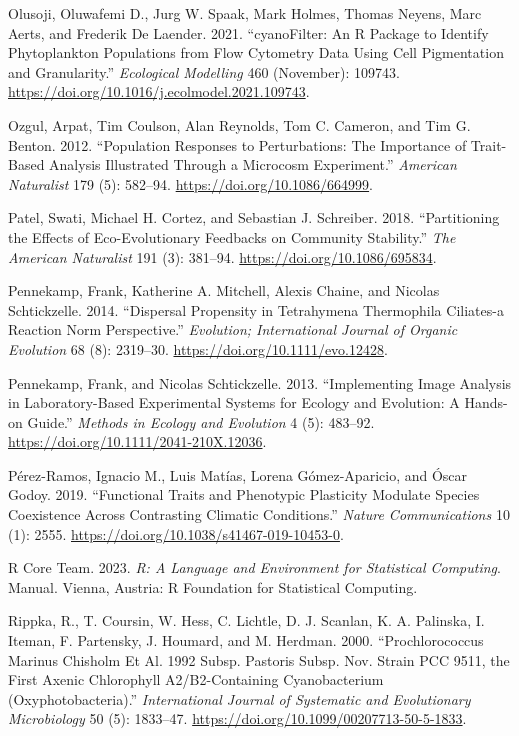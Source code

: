 \documentclass[
  letterpaper,
  DIV=11,
  numbers=noendperiod]{scrartcl}
\begin{document}
\begin{CSLReferences}
Olusoji, Oluwafemi D., Jurg W. Spaak, Mark Holmes, Thomas Neyens, Marc
Aerts, and Frederik De Laender. 2021. {``{cyanoFilter}: {An R} Package
to Identify Phytoplankton Populations from Flow Cytometry Data Using
Cell Pigmentation and Granularity.''} \emph{Ecological Modelling} 460
(November): 109743.
\url{https://doi.org/10.1016/j.ecolmodel.2021.109743}.

Ozgul, Arpat, Tim Coulson, Alan Reynolds, Tom C. Cameron, and Tim G.
Benton. 2012. {``Population Responses to Perturbations: {The} Importance
of Trait-Based Analysis Illustrated Through a Microcosm Experiment.''}
\emph{American Naturalist} 179 (5): 582--94.
\url{https://doi.org/10.1086/664999}.

Patel, Swati, Michael H. Cortez, and Sebastian J. Schreiber. 2018.
{``Partitioning the {Effects} of {Eco-Evolutionary Feedbacks} on
{Community Stability}.''} \emph{The American Naturalist} 191 (3):
381--94. \url{https://doi.org/10.1086/695834}.

Pennekamp, Frank, Katherine A. Mitchell, Alexis Chaine, and Nicolas
Schtickzelle. 2014. {``Dispersal Propensity in Tetrahymena Thermophila
Ciliates-a Reaction Norm Perspective.''} \emph{Evolution; International
Journal of Organic Evolution} 68 (8): 2319--30.
\url{https://doi.org/10.1111/evo.12428}.

Pennekamp, Frank, and Nicolas Schtickzelle. 2013. {``Implementing Image
Analysis in Laboratory-Based Experimental Systems for Ecology and
Evolution: {A} Hands-on Guide.''} \emph{Methods in Ecology and
Evolution} 4 (5): 483--92.
\url{https://doi.org/10.1111/2041-210X.12036}.

Pérez-Ramos, Ignacio M., Luis Matías, Lorena Gómez-Aparicio, and Óscar
Godoy. 2019. {``Functional Traits and Phenotypic Plasticity Modulate
Species Coexistence Across Contrasting Climatic Conditions.''}
\emph{Nature Communications} 10 (1): 2555.
\url{https://doi.org/10.1038/s41467-019-10453-0}.

R Core Team. 2023. \emph{R: {A} Language and Environment for Statistical
Computing}. Manual. {Vienna, Austria}: {R Foundation for Statistical
Computing}.

Rippka, R., T. Coursin, W. Hess, C. Lichtle, D. J. Scanlan, K. A.
Palinska, I. Iteman, F. Partensky, J. Houmard, and M. Herdman. 2000.
{``Prochlorococcus Marinus {Chisholm} Et Al. 1992 Subsp. Pastoris Subsp.
Nov. Strain {PCC} 9511, the First Axenic Chlorophyll A2/B2-Containing
Cyanobacterium ({Oxyphotobacteria}).''} \emph{International Journal of
Systematic and Evolutionary Microbiology} 50 (5): 1833--47.
\url{https://doi.org/10.1099/00207713-50-5-1833}.


\end{CSLReferences}
\end{document}

